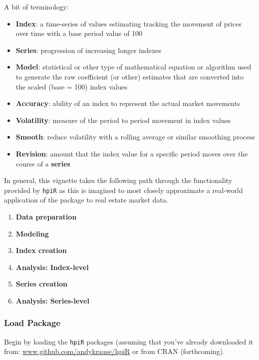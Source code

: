 \documentclass[]{article}
\providecommand{\tightlist}{%
  \setlength{\itemsep}{0pt}\setlength{\parskip}{0pt}}
\begin{document}
A bit of terminology:

\begin{itemize}
\tightlist
\item
  \textbf{Index}: a time-series of values estimating tracking the
  movement of prices over time with a base period value of 100
\item
  \textbf{Series}: progression of increasing longer indexes\\
\item
  \textbf{Model}: statistical or other type of mathematical equation or
  algorithm used to generate the raw coefficient (or other) estimates
  that are converted into the scaled (base = 100) index values
\item
  \textbf{Accuracy}: ability of an index to represent the actual market
  movements
\item
  \textbf{Volatility}: measure of the period to period movement in index
  values
\item
  \textbf{Smooth}: reduce volatility with a rolling average or similar
  smoothing process
\item
  \textbf{Revision}: amount that the index value for a specific period
  moves over the course of a \textbf{series}
\end{itemize}

In general, this vignette takes the following path through the
functionality provided by \texttt{hpiR} as this is imagined to most
closely approximate a real-world application of the package to real
estate market data.

\begin{enumerate}
\def\labelenumi{\arabic{enumi}.}
\tightlist
\item
  \textbf{Data preparation}
\item
  \textbf{Modeling}
\item
  \textbf{Index creation}
\item
  \textbf{Analysis: Index-level}
\item
  \textbf{Series creation}
\item
  \textbf{Analysis: Series-level}
\end{enumerate}

\subsubsection{Load Package}\label{load-package}

Begin by loading the \texttt{hpiR} packages (assuming that you've
already downloaded it from:
\href{https://www.github.com/andykrause/hpiR}{www.github.com/andykrause/hpiR}
or from CRAN (forthcoming).
\end{document}
